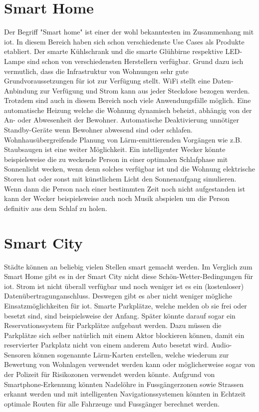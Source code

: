 \section{Smart Home}
Der Begriff "Smart home" ist einer der wohl bekanntesten im Zusammenhang mit \gls{iot}. In diesem Bereich haben sich schon verschiedenste Use Cases als Produkte etabliert. Der smarte Kühlschrank und die smarte Glühbirne respektive LED-Lampe sind schon von verschiedensten Herstellern verfügbar. Grund dazu isch vermutlich, dass die Infrastruktur von Wohnungen sehr gute Grundvoraussetzungen für \gls{iot} zur Verfügung stellt. WiFi stellt eine Daten-Anbindung zur Verfügung und Strom kann aus jeder Steckdose bezogen werden. Trotzdem sind auch in diesem Bereich noch viele Anwendungsfälle möglich. Eine automatische Heizung welche die Wohnung dynamisch beheizt, abhängig von der An- oder Abwesenheit der Bewohner. Automatische Deaktivierung unnötiger Standby-Geräte wenn Bewohner abwesend sind oder schlafen. Wohnhausübergreifende Planung von Lärm-emittierenden Vorgängen wie z.B. Staubsaugen ist eine weiter Möglichkeit. Ein intelligenter Wecker könnte beispielsweise die zu weckende Person in einer optimalen Schlafphase mit Sonnenlicht wecken, wenn denn solches verfügbar ist und die Wohnung elektrische Storen hat oder sonst mit künstlichem Licht den Sonnenaufgang simulieren. Wenn dann die Person nach einer bestimmten Zeit noch nicht aufgestanden ist kann der Wecker beispielsweise auch noch Musik abspielen um die Person definitiv aus dem Schlaf zu holen.

\section{Smart City}
Städte können an beliebig vielen Stellen \glqq{}smart\grqq{} gemacht werden. Im Verglich zum Smart Home gibt es in der Smart City nicht diese Schön-Wetter-Bedingungen für \gls{iot}. Strom ist nicht überall verfügbar und noch weniger ist es ein (kostenloser) Datenübertragunganschluss. Deswegen gibt es aber nicht weniger mögliche Einsatzmöglichkeiten für \gls{iot}. Smarte Parkplätze, welche melden ob sie frei oder besetzt sind, sind beispielsweise der Anfang. Später könnte darauf sogar ein Reservationssystem für Parkplätze aufgebaut werden. Dazu müssen die Parkplätze sich selber natürlich mit einem Aktor blockieren können, damit ein reservierter Parkplatz nicht von einem anderem Auto besetzt wird. Audio-Sensoren können sogenannte Lärm-Karten erstellen, welche wiederum zur Bewertung von Wohnlagen verwendet werden kann oder möglicherweise sogar von der Polizeit für Risikozonen verwendet werden könnte. Aufgrund von Smartphone-Erkennung könnten Nadelöhre in Fussgängerzonen sowie Strassen erkannt werden und mit intelligenten Navigationssystemen könnten in Echtzeit optimale Routen für alle Fahrzeuge und Fussgänger berechnet werden.
\iffalse
